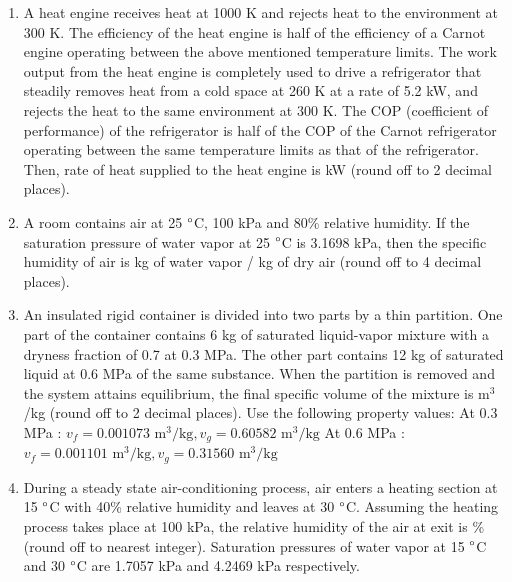\documentclass[a4paper,10pt]{article}
\begin{document}
\begin{enumerate}
\hfill{}

\item A heat engine receives heat at 1000 K and rejects heat to the environment at 300 K. The efficiency of the heat engine is half of the efficiency of a Carnot engine operating between the above mentioned temperature limits. The work output from the heat engine is completely used to drive a refrigerator that steadily removes heat from a cold space at 260 K at a rate of 5.2 kW, and rejects the heat to the same environment at 300 K. The COP (coefficient of performance) of the refrigerator is half of the COP of the Carnot refrigerator operating between the same temperature limits as that of the refrigerator. Then, rate of heat supplied to the heat engine is \underline{\hspace{2cm}} kW (round off to 2 decimal places).

\hfill{}

\item A room contains air at 25 $\degree$C, 100 kPa and 80\% relative humidity. If the saturation pressure of water vapor at 25 $\degree$C is 3.1698 kPa, then the specific humidity of air is \underline{\hspace{2cm}} kg of water vapor / kg of dry air (round off to 4 decimal places).

\hfill{}

\item An insulated rigid container is divided into two parts by a thin partition. One part of the container contains 6 kg of saturated liquid-vapor mixture with a dryness fraction of 0.7 at 0.3 MPa. The other part contains 12 kg of saturated liquid at 0.6 MPa of the same substance. When the partition is removed and the system attains equilibrium, the final specific volume of the mixture is \underline{\hspace{2cm}} m$^3$/kg (round off to 2 decimal places).
Use the following property values:
At 0.3 MPa : $v_f = 0.001073 \text{ m}^3/\text{kg}, v_g = 0.60582 \text{ m}^3/\text{kg}$
At 0.6 MPa : $v_f = 0.001101 \text{ m}^3/\text{kg}, v_g = 0.31560 \text{ m}^3/\text{kg}$

\hfill{}

\item During a steady state air-conditioning process, air enters a heating section at 15 $\degree$C with 40\% relative humidity and leaves at 30 $\degree$C. Assuming the heating process takes place at 100 kPa, the relative humidity of the air at exit is \underline{\hspace{2cm}} \% (round off to nearest integer).
Saturation pressures of water vapor at 15 $\degree$C and 30 $\degree$C are 1.7057 kPa and 4.2469 kPa respectively.


\end{enumerate}
\end{document}
